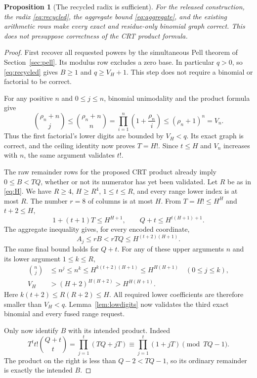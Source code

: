 \documentclass[10pt,letterpaper]{article}
\newtheorem{proposition}[theorem]{Proposition}
\theoremstyle{definition}\newtheorem{definition}[theorem]{Definition}
\theoremstyle{remark}\newtheorem{remark}[theorem]{Remark}
\begin{document}
\begin{proposition}[The recycled radix is sufficient]\label{prop:radix}
For the released construction, the radix \eqref{eq:recycled}, the
aggregate bound \eqref{eq:aggregate}, and the existing arithmetic rows
make every exact and residue-only binomial graph correct. This does not
presuppose correctness of the CRT product formula.
\end{proposition}
\begin{proof}
First recover all requested powers by the simultaneous Pell theorem of
Section~\ref{sec:pell}. Its modulus row excludes a zero base. In
particular $q>0$, so \eqref{eq:recycled} gives $B\ge1$ and $q\ge V_H+1$.
This step does not require a binomial or factorial to be correct.

For any positive $n$ and $0\le j\le n$, binomial unimodality and
the product formula give
\begin{equation}\label{eq:factlow}
 \binom{\rho_n+n}{j}\le\binom{\rho_n+n}{n}
       =\prod_{i=1}^n\left(1+\frac{\rho_n}{i}\right)
       \le(\rho_n+1)^n=V_n.
\end{equation}
Thus the first factorial's lower digits are bounded by $V_H<q$.
Its exact graph is correct, and the ceiling identity now proves $T=H!$.
Since $t\le H$ and $V_n$ increases with $n$, the same argument validates
$t!$.

The raw remainder rows for the proposed CRT product already imply
$0\le B<TQ$, whether or not its numerator has yet been validated.
Let $R$ be as in \eqref{eq:H}. We have $R\ge4$, $H\ge R^4$,
$1\le t\le R$, and every range lower index is at most $R$.
The number $r=8$ of columns is at most $H$. From $T=H!\le H^H$
and $t+2\le H$,
\[
 1+(t+1)T\le H^{H+1},\qquad
 Q+t\le H^{t(H+1)+1}.
\]
The aggregate inequality gives, for every encoded coordinate,
\[
 A_j\le rB<rTQ\le H^{(t+2)(H+1)}.
\]
The same final bound holds for $Q+t$. For any of these upper arguments
$n$ and its lower argument $1\le k\le R$,
\begin{align*}
 \binom nj&\le n^j\le n^k
       \le H^{k(t+2)(H+1)}\le H^{H(H+1)}\quad(0\le j\le k),\\
 V_H&>(H+2)^{H(H+2)}>H^{H(H+1)}.
\end{align*}
Here $k(t+2)\le R(R+2)\le H$. All required lower coefficients are
therefore smaller than $V_H<q$. Lemma~\ref{lem:lowdigits} now validates
the third exact binomial and every fused range request.

Only now identify $B$ with its intended product. Indeed
\[
 T^t t!\binom{Q+t}{t}=\prod_{j=1}^t(TQ+jT)
       \equiv\prod_{j=1}^t(1+jT)\pmod{TQ-1}.
\]
The product on the right is less than $Q-2<TQ-1$, so its ordinary
remainder is exactly the intended $B$.
\end{proof}
\end{document}
